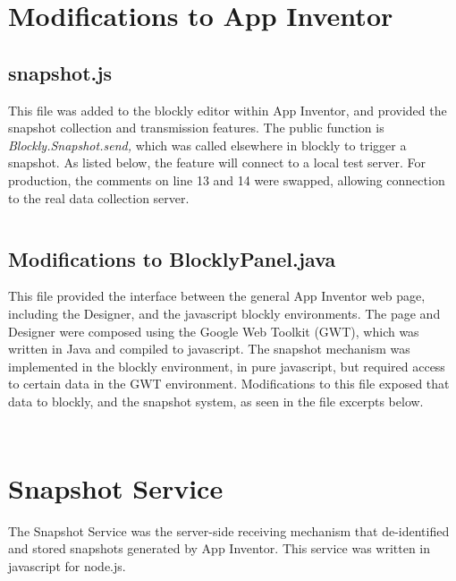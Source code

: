 

\section{Modifications to App Inventor}
\label{src:appinventor}

\subsection{snapshot.js}
\label{src:ai/snapshot.js}
This file was added to the blockly editor within App Inventor, and provided the snapshot collection and transmission features. The public function is \emph{Blockly.Snapshot.send,} which was called elsewhere in blockly to trigger a snapshot. As listed below, the feature will connect to a local test server. For production, the comments on line 13 and 14 were swapped, allowing connection to the real data collection server. 
\inputminted{javascript}{src/appinventor/snapshot.js}

\subsection{Modifications to BlocklyPanel.java}
\label{src:ai/BlocklyPanel.java}
This file provided the interface between the general App Inventor web page, including the Designer, and the javascript blockly environments. The page and Designer were composed using the Google Web Toolkit (GWT), which was written in Java and compiled to javascript. The snapshot mechanism was implemented in the blockly environment, in pure javascript, but required access to certain data in the GWT environment. Modifications to this file exposed that data to blockly, and the snapshot system, as seen in the file excerpts below.

\inputminted[firstline=626, lastline=651]{java}{src/appinventor/BlocklyPanel.java}
\inputminted[firstline=902, lastline=913, breakbefore=.]{java}{src/appinventor/BlocklyPanel.java}


\section{Snapshot Service}
\label{src:snapshot-service}
The Snapshot Service was the server-side receiving mechanism that de-identified and stored snapshots generated by App Inventor. This service was written in javascript for node.js.

